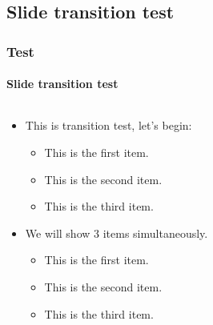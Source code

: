 \documentclass[aspectratio=169,hyperref={implicit=true}]{beamer}
\begin{document}
\subsection{Slide transition test}
\begin{frame}
\frametitle{Test}
\framesubtitle{Slide transition test}
  \label{sec:slidetrans}
  \begin{columns}
    \begin{column}{.48\textwidth}
      \begin{itemize}
        \item<1-> This is transition test, let's begin:
        \begin{itemize}
          \item<2-> This is the first item.
          \item<3-> This is the second item.
          \item<4-> This is the third item.
        \end{itemize}
        \item<5-> We will show 3 items simultaneously.
        \begin{itemize}
          \item<6-> This is the first item.
          \item<6-> This is the second item.
          \item<6-> This is the third item.
        \end{itemize}
      \end{itemize}
    \end{column}
    \begin{column}{.48\textwidth}
    \end{column}
  \end{columns}
\end{frame}

\ThankYouFrame
\end{document}
